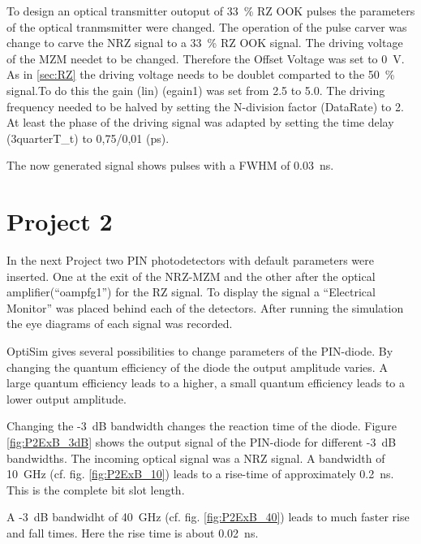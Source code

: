 To design an optical transmitter outoput of 33~\% RZ OOK pulses the parameters of the optical tranmsmitter were changed. 
The operation of the pulse carver was change to carve the NRZ signal to a 33~\% RZ OOK signal. The driving voltage of the MZM needet to be changed. Therefore the Offset Voltage was set to 0~V. As in \ref{sec:RZ} the driving voltage needs to be doublet comparted to the 50~\% signal.To do this the gain (lin) (egain1) was set from 2.5 to 5.0. The driving frequency needed to be halved by setting the N-division factor (DataRate) to 2.
At least the phase of the driving signal was adapted by setting the time delay (3quarterT\_t) to 0,75/0,01 (ps).

The now generated signal shows pulses with a FWHM of 0.03~ns.



\section{Project 2}
In the next Project two PIN photodetectors with default parameters were inserted. One at the exit of the NRZ-MZM and the other after the optical amplifier("`oampfg1"') for the RZ signal. To display the signal a "`Electrical Monitor"' was placed behind each of the detectors. After running the simulation the eye diagrams of each signal was recorded. 


OptiSim gives several possibilities to change parameters of the PIN-diode. 
By changing the quantum efficiency of the diode the output amplitude varies. A large quantum efficiency leads to a higher, a small quantum efficiency leads to a lower output amplitude. 

Changing the -3~dB bandwidth changes the reaction time of the diode. 
Figure \ref{fig:P2ExB_3dB} shows the output signal of the PIN-diode for different -3~dB bandwidths. The incoming optical signal was a NRZ signal. A bandwidth of 10~GHz (cf. fig. \ref{fig:P2ExB_10}) leads to a rise-time of approximately 0.2~ns. This is the complete bit slot length.

A -3~dB bandwidht of 40~GHz (cf. fig. \ref{fig:P2ExB_40}) leads to much faster rise and fall times. Here the rise time is about 0.02~ns.


